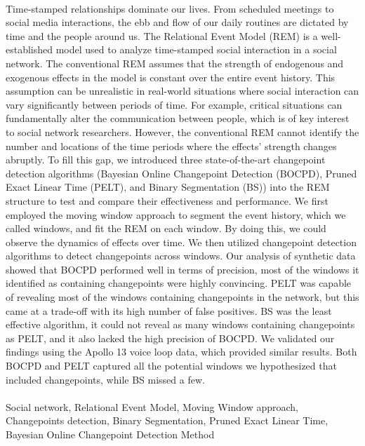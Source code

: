 \documentclass[]{interact}
\theoremstyle{plain}%
\theoremstyle{definition}
\theoremstyle{remark}
\begin{document}
	
	
	\vspace*{1cm}
	 \\
	
	\small{Time-stamped relationships dominate our lives. From scheduled meetings to social media interactions, the ebb and flow of our daily routines are dictated by time and the people around us. The Relational Event Model (REM) is a well-established model used to analyze time-stamped social interaction in a social network. The conventional REM assumes that the strength of endogenous and exogenous effects in the model is constant over the entire event history. This assumption can be unrealistic in real-world situations where social interaction can vary significantly between periods of time. For example, critical situations can fundamentally alter the communication between people, which is of key interest to social network researchers. However, the conventional REM cannot identify the number and locations of the time periods where the effects' strength changes abruptly. To fill this gap, we introduced three state-of-the-art changepoint detection algorithms (Bayesian Online Changepoint Detection (BOCPD), Pruned Exact Linear Time (PELT), and Binary Segmentation (BS)) into the REM structure to test and compare their effectiveness and performance. We first employed the moving window approach to segment the event history, which we called windows, and fit the REM on each window. By doing this, we could observe the dynamics of effects over time. We then utilized changepoint detection algorithms to detect changepoints across windows. Our analysis of synthetic data showed that BOCPD performed well in terms of precision, most of the windows it identified as containing changepoints were highly convincing. PELT was capable of revealing most of the windows containing changepoints in the network, but this came at a trade-off with its high number of false positives. BS was the least effective algorithm, it could not reveal as many windows containing changepoints as PELT, and it also lacked the high precision of BOCPD. We validated our findings using the Apollo 13 voice loop data, which provided similar results. Both BOCPD and PELT captured all the potential windows we hypothesized that included changepoints, while BS missed a few.} \\
	
	 \\
	\small{Social network, Relational Event Model, Moving Window approach, Changepoints detection, Binary Segmentation, Pruned Exact Linear Time, Bayesian Online Changepoint Detection Method} \\
	
\end{document}
